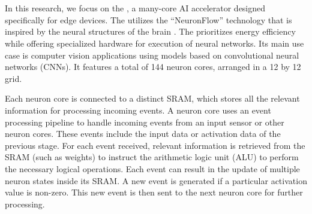 \section{\graicore{}}
In this research, we focus on the \graicore{}, a many-core AI accelerator designed specifically for edge devices.
The \graicore{} utilizes the ``NeuronFlow'' technology that is inspired by the neural structures of the brain \cite{moreiraNeuronFlowNeuromorphicProcessor2020}.
The \graicore{} prioritizes energy efficiency while offering specialized hardware for execution of neural networks. 
Its main use case is computer vision applications using models based on convolutional neural networks (CNNs).
It features a total of 144 neuron cores, arranged in a 12 by 12 grid.


Each neuron core is connected to a distinct SRAM, which stores all the relevant information for processing incoming events.
A neuron core uses an event processing pipeline to handle incoming events from an input sensor or other neuron cores.
These events include the input data or activation data of the previous stage.
For each event received, relevant information is retrieved from the SRAM (such as weights) to instruct the arithmetic logic unit (ALU) to perform the necessary logical operations.
Each event can result in the update of multiple neuron states inside its SRAM.
A new event is generated if a particular activation value is non-zero.
This new event is then sent to the next neuron core for further processing.

